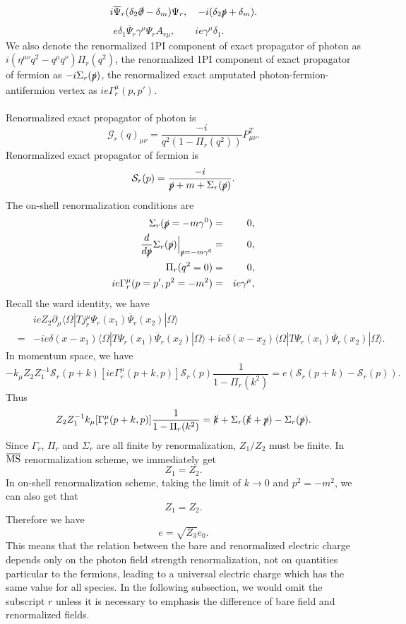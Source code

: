 \[i\overline{\Psi}_r (\delta_{2}\slashed{\partial} - \delta_m)\Psi_r , \quad -i(\delta_2\slashed{p}+\delta_m).\]
\[ e \delta_1 \overline{\Psi}_r\gamma^{\mu}\Psi_r A_{r\mu} , \quad  \quad ie \gamma^{\mu}\delta_1 . \quad  \quad   \quad \]
We also denote the renormalized 1PI component of exact propagator of photon as $i(\eta^{\mu\nu}q^2 -q^{\mu}q^{\nu})\Pi_r(q^2)$, the renormalized 1PI component of exact propagator of fermion as $-i\Sigma_r(\slashed{p})$, the renormalized exact amputated photon-fermion-antifermion vertex as $ie\Gamma^{\mu}_r(p,p')$. 
\\ \\
Renormalized exact propagator of photon is
\[\mathcal{G}_r(q)_{\mu\nu} = \frac{-i}{q^2(1-\Pi_r(q^2))}P^T_{\mu\nu}.\]
Renormalized exact propagator of fermion is
\[\mathcal{S}_r(p) = \frac{-i}{\slashed{p}+m+\Sigma_r(\slashed{p})}.\]
The on-shell renormalization conditions are
\begin{eqnarray}
\Sigma_r(\slashed{p}=-m\gamma^0) &=& 0 ,\nonumber \\
\frac{d}{d\slashed{p}} \Sigma_r(\slashed{p}) \Big|_{\slashed{p} = -m\gamma^0} &=& 0 ,\nonumber \\
\Pi_r(q^2 = 0) &=& 0 ,\nonumber \\
ie\Gamma^{\mu}_r(p=p',p^2=-m^2) &=& ie\gamma^{\mu} ,\nonumber
\end{eqnarray}
Recall the ward identity, we have
\begin{eqnarray}
&\phantom{=}& ieZ_2\partial_{\mu} \langle \Omega | T j_r^{\mu} \Psi_r(x_1) \overline{\Psi}_r(x_2)| \Omega\rangle \nonumber \\
&=& -ie\delta(x-x_1)\langle \Omega | T \Psi_r(x_1) \overline{\Psi}_r(x_2)| \Omega\rangle + ie\delta(x-x_2)\langle \Omega | T \Psi_r(x_1) \overline{\Psi}_r(x_2)| \Omega\rangle .\nonumber
\end{eqnarray}
In momentum space, we have
\[-k_{\mu} Z_2 Z_1^{-1} \mathcal{S}_r(p+k) [ie\Gamma^{\mu}_r(p+k,p)] \mathcal{S}_r(p) \frac{1}{1-\Pi_r(k^2)} = e(\mathcal{S}_r(p+k) - \mathcal{S}_r(p)) .\]
Thus
\[Z_2 Z_1^{-1} k_{\mu} [\Gamma^{\mu}_r(p+k,p)] \frac{1}{1-\Pi_r(k^2)} =\slashed{k}+\Sigma_r(\slashed{k}+\slashed{p})-\Sigma_r(\slashed
{p}).\]
Since $\Gamma_r$, $\Pi_r$ and $\Sigma_r$ are all finite by renormalization, $Z_1/Z_2$ must be finite.
In $\overline{\rm MS}$ renormalization scheme, we immediately get
\[Z_1 = Z_2.\]
In on-shell renormalization scheme, taking the limit of $k \to 0$ and $p^2 = -m^2$, we can also get that
\[Z_1 = Z_2.\]
Therefore we have
\[e = \sqrt{Z_3}e_0.\]
This means that the relation between the bare and renormalized electric charge depends only on the photon field strength renormalization, not on quantities particular to the fermions, leading to a universal electric charge which has the same value for all species.
In the following subsection, we would omit the subscript $r$ unless it is necessary to emphasis the difference of bare field and renormalized fields.


